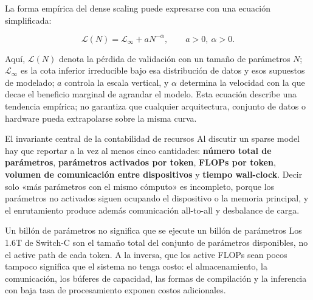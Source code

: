 La forma empírica del dense scaling puede expresarse con una ecuación simplificada:

\[
\mathcal{L}(N)=\mathcal{L}_{\infty}+aN^{-\alpha},\qquad a>0,\ \alpha>0.
\]

Aquí, $\mathcal{L}(N)$ denota la pérdida de validación con un tamaño de parámetros $N$; $\mathcal{L}_{\infty}$ es la cota inferior irreducible bajo esa distribución de datos y esos supuestos de modelado; $a$ controla la escala vertical, y $\alpha$ determina la velocidad con la que decae el beneficio marginal de agrandar el modelo. Esta ecuación describe una tendencia empírica; no garantiza que cualquier arquitectura, conjunto de datos o hardware pueda extrapolarse sobre la misma curva.



\begin{importantbox}{El invariante central de la contabilidad de recursos}
Al discutir un sparse model hay que reportar a la vez al menos cinco cantidades: \textbf{número total de parámetros}, \textbf{parámetros activados por token}, \textbf{FLOPs por token}, \textbf{volumen de comunicación entre dispositivos} y \textbf{tiempo wall-clock}. Decir solo «más parámetros con el mismo cómputo» es incompleto, porque los parámetros no activados siguen ocupando el dispositivo o la memoria principal, y el enrutamiento produce además comunicación all-to-all y desbalance de carga.
\end{importantbox}

\begin{warningbox}{Un billón de parámetros no significa que se ejecute un billón de parámetros}
Los 1.6T de Switch-C son el tamaño total del conjunto de parámetros disponibles, no el active path de cada token. A la inversa, que los active FLOPs sean pocos tampoco significa que el sistema no tenga costo: el almacenamiento, la comunicación, los búferes de capacidad, las formas de compilación y la inferencia con baja tasa de procesamiento exponen costos adicionales.
\end{warningbox}

